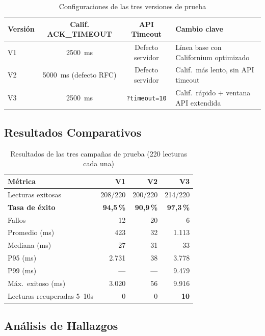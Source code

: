 \documentclass[11pt,a4paper]{article}
\begin{document}
\begin{table}[H]
\centering
\caption{Configuraciones de las tres versiones de prueba}
\label{tab:versiones}
\begin{tabularx}{\textwidth}{l c c X}
\toprule
\textbf{Versión} & \textbf{Calif. ACK\_TIMEOUT} & \textbf{API Timeout} & \textbf{Cambio clave} \\
\midrule
V1 & \SI{2500}{\milli\second} & Defecto servidor & Línea base con Californium optimizado \\
V2 & \SI{5000}{\milli\second} (defecto RFC) & Defecto servidor & Calif.\ más lento, sin API timeout \\
V3 & \SI{2500}{\milli\second} & \texttt{?timeout=10} & Calif.\ rápido + ventana API extendida \\
\bottomrule
\end{tabularx}
\end{table}

\subsection{Resultados Comparativos}

\begin{table}[H]
\centering
\caption{Resultados de las tres campañas de prueba (220 lecturas cada una)}
\label{tab:resultados}
\begin{tabular}{l r r r}
\toprule
\textbf{Métrica} & \textbf{V1} & \textbf{V2} & \textbf{V3} \\
\midrule
Lecturas exitosas & 208/220 & 200/220 & 214/220 \\
\textbf{Tasa de éxito} & \textbf{94,5\,\%} & \textbf{90,9\,\%} & \textbf{\color{success-green}97,3\,\%} \\
Fallos & 12 & 20 & 6 \\
\addlinespace
Promedio (ms) & 423 & 32 & 1.113 \\
Mediana (ms) & 27 & 31 & 33 \\
P95 (ms) & 2.731 & 38 & 3.778 \\
P99 (ms) & --- & --- & 9.479 \\
Máx.\ exitoso (ms) & 3.020 & 56 & 9.916 \\
\addlinespace
Lecturas recuperadas 5--10s & 0 & 0 & \textbf{10} \\
\bottomrule
\end{tabular}
\end{table}

\subsection{Análisis de Hallazgos}
\end{document}
